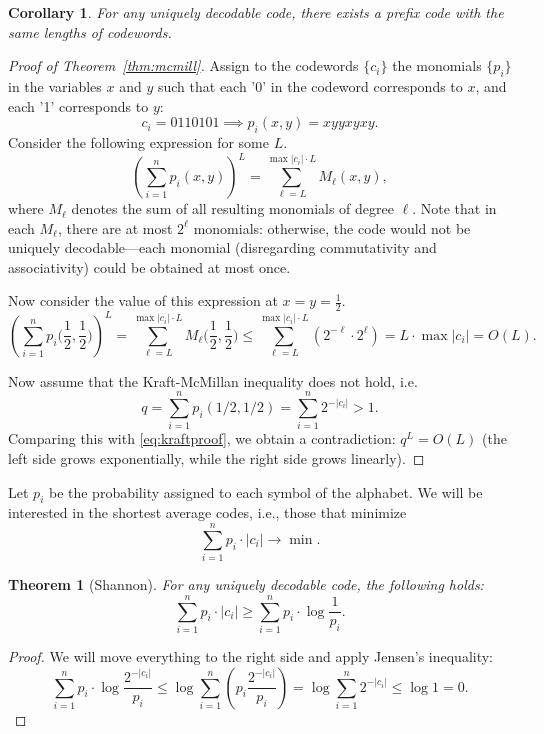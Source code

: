 \documentclass[12pt,sans]{article}
\newcommand{\sshalf}{{\textstyle\frac12}}
\theoremstyle{definition}
\theoremstyle{plain}
\newtheorem{theorem}{Theorem}[section]
\newtheorem{corollary}{Corollary}[section]
\theoremstyle{remark}
\begin{document}
\begin{corollary}
    For any uniquely decodable code, there exists a prefix code with the same
    lengths of codewords.
\end{corollary}

\begin{proof}[Proof of Theorem~\ref{thm:mcmill}]
    Assign to the codewords \(\{c_i\}\) the monomials \(\{p_i\}\) in the variables \(x\) and \(y\) such
    that each '0' in the codeword corresponds to \(x\), and each '1' corresponds to \(y\):
    \[
    c_i = 0110101 \implies p_i(x,y) = xyyxyxy.
    \]
    Consider the following expression for some \(L\).
    \[
    \left( \sum_{i=1}^n p_i(x,y) \right)^L = \sum_{\ell=L}^{\max|c_i| \cdot L} M_\ell(x,y),
    \]
    where \(M_\ell\) denotes the sum of all resulting monomials of degree \(\ell\).
    Note that in each \(M_\ell\), there are at most \(2^\ell\) monomials: otherwise,
    the code would not be uniquely decodable—each monomial (disregarding
    commutativity and associativity) could be obtained at most once.

    Now consider the value of this expression at \(x = y = \frac{1}{2}\).
    \begin{equation}\label{eq:kraftproof}
        \left( \sum_{i=1}^n p_i\bigl(\sshalf,\sshalf\bigr) \right)^L =
        \sum_{\ell=L}^{\max|c_i| \cdot L} M_\ell\bigl(\sshalf,\sshalf\bigr) \le
        \sum_{\ell=L}^{\max|c_i| \cdot L} (2^{-\ell} \cdot 2^\ell) =
        L\cdot\max|c_i| = O(L).
    \end{equation}

    Now assume that the Kraft-McMillan inequality does not hold, i.e.
    \[
    q = \sum_{i=1}^n p_i(1/2,1/2) = \sum_{i=1}^n 2^{-|c_i|} > 1.
    \]
    Comparing this with \eqref{eq:kraftproof}, we obtain a contradiction:
    \(
    q^L = O(L)
    \)
    (the left side grows exponentially, while the right side grows linearly).
\end{proof}

Let \(p_i\) be the probability assigned to each symbol of the alphabet. We will be
interested in the shortest average codes, i.e., those that minimize
\[
\sum_{i=1}^n p_i \cdot |c_i| \to \min.
\]
\begin{theorem}[Shannon]
    For any uniquely decodable code, the following holds:
    \[
    \sum_{i=1}^n p_i \cdot |c_i| \ge \sum_{i=1}^n p_i \cdot \log \frac{1}{p_i}.
    \]
\end{theorem}
\begin{proof}
    We will move everything to the right side and apply Jensen's inequality:
    \[
    \sum_{i=1}^n p_i \cdot \log \frac{2^{-|c_i|}}{p_i} \le
    \log \sum_{i=1}^n \left(p_i \frac{2^{-|c_i|}}{p_i}\right) =
    \log \sum_{i=1}^n 2^{-|c_i|} \le \log 1 = 0.
    \]
\end{proof}
\end{document}
